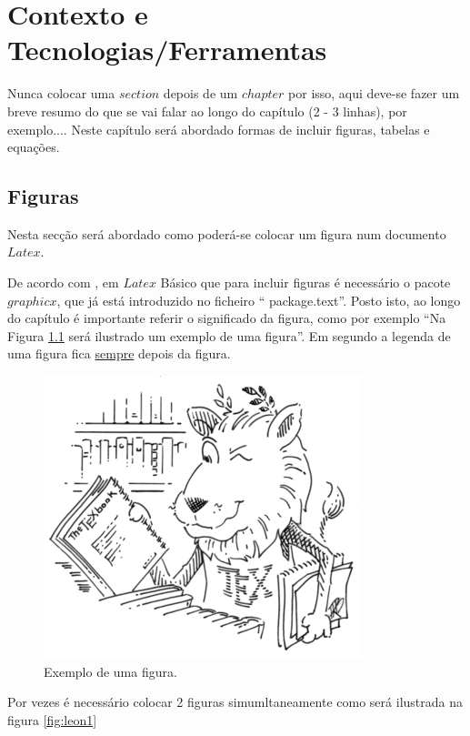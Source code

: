 \chapter{Contexto e Tecnologias/Ferramentas}\label{cap2}

\begin{adjustwidth}{2.5cm}{0.3cm}
Nunca colocar uma $section$ depois de um $chapter$ por isso, aqui deve-se fazer um breve resumo do que se vai falar ao longo do capítulo (2 - 3 linhas), por exemplo....
Neste capítulo será abordado formas de incluir figuras, tabelas e equações.
\end{adjustwidth}

\section{Figuras}
Nesta secção será abordado como poderá-se colocar um figura num documento $Latex$.\par
De acordo com \cite{overleaf}, em $Latex$ Básico que para incluir figuras é necessário o pacote $graphicx$, que já está introduzido no ficheiro `` package.text''. Posto isto, ao longo do capítulo é importante referir o significado da figura, como por exemplo ``Na Figura \ref{fig:leon} será ilustrado um exemplo de uma figura''. Em segundo a legenda de uma figura fica  \underline{sempre} depois da figura.
\begin{figure}[htpb]
    \centering
    \includegraphics[scale=0.4]{imagens/lion_large.png}
    \caption{Exemplo de uma figura.}
    \label{fig:leon}
\end{figure}\par 
Por vezes é necessário colocar 2 figuras simumltaneamente como será ilustrada na figura \ref{fig:leon1}
